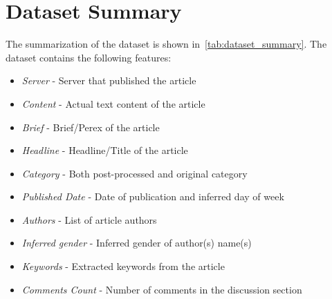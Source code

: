 \section{Dataset Summary}
\begin{table}[t]
\end{table}
The summarization of the dataset is shown in~\autoref{tab:dataset_summary}.
The dataset contains the following features:
\begin{itemize}
    \item \emph{Server} - Server that published the article
    \item \emph{Content} - Actual text content of the article
    \item \emph{Brief} - Brief/Perex of the article
    \item \emph{Headline} - Headline/Title of the article
    \item \emph{Category} - Both post-processed and original category
    \item \emph{Published Date} - Date of publication and inferred day of week
    \item \emph{Authors} - List of article authors
    \item \emph{Inferred gender} - Inferred gender of author(s) name(s)
    \item \emph{Keywords} - Extracted keywords from the article
    \item \emph{Comments Count} - Number of comments in the discussion section
\end{itemize}

